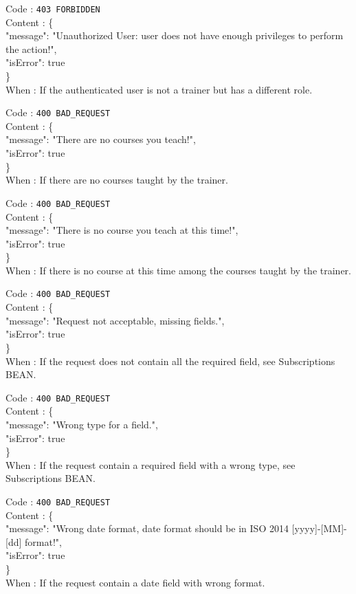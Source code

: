 \begin{itemize}
	Code : \texttt{403 FORBIDDEN}\\
	Content : \{ \\
	\tab "message": "Unauthorized User: user does not have enough privileges to perform the action!",\\
	\tab "isError": true\\
	\tab \}\\
	When : If the authenticated user is not a trainer but has a different role.
	
	Code : \texttt{400 BAD\_REQUEST}\\
	Content : \{\\
	\tab "message": "There are no courses you teach!",\\
	\tab "isError": true\\
	\tab \}\\
	When : If there are no courses taught by the trainer.
	
	Code : \texttt{400 BAD\_REQUEST}\\
	Content : \{\\
	\tab "message": "There is no course you teach at this time!",\\
	\tab "isError": true\\
	\tab \}\\
	When : If there is no course at this time among the courses taught by the trainer.
	
	Code : \texttt{400 BAD\_REQUEST}\\
	Content : \{ \\
	\tab "message": "Request not acceptable, missing fields.",\\
	\tab "isError": true \\
	\tab \}\\
	When : If the request does not contain all the required field, see Subscriptions BEAN.
	
	Code : \texttt{400 BAD\_REQUEST}\\
	Content : \{ \\
	\tab "message": "Wrong type for a field.",\\
	\tab "isError": true \\
	\tab \}\\
	When : If the request contain a required field with a wrong type, see Subscriptions BEAN.
	
	Code : \texttt{400 BAD\_REQUEST}\\
	Content : \{ \\
	\tab "message": "Wrong date format, date format should be in ISO 2014  [yyyy]-[MM]-[dd] format!",\\
	\tab "isError": true \\
	\tab \}\\
	When : If the request contain a date field with wrong format.
	

\end{itemize}
